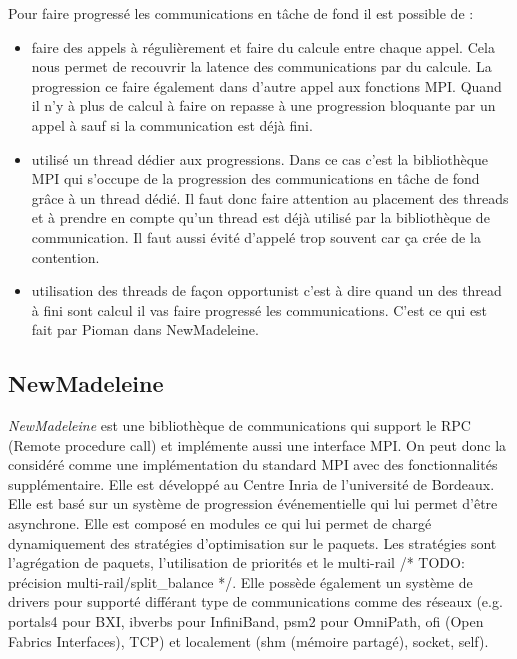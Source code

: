 Pour faire progressé les communications en tâche de fond il est possible de :

\begin{itemize}
  \item faire des appels à  régulièrement et faire du calcule entre chaque appel.
  Cela nous permet de recouvrir la latence des communications par du calcule.
  La progression ce faire également dans d'autre appel aux fonctions MPI.
  Quand il n'y à plus de calcul à faire on repasse à une progression bloquante par un appel à  sauf si la communication est déjà fini.
  \item utilisé un thread dédier aux progressions.
  Dans ce cas c'est la bibliothèque MPI qui s'occupe de la progression des communications en tâche de fond grâce à un thread dédié.
  Il faut donc faire attention au placement des threads et à prendre en compte qu'un thread est déjà utilisé par la bibliothèque de communication.
  Il faut aussi évité d'appelé trop souvent  car ça crée de la contention.
  \item utilisation des threads de façon opportunist c'est à dire quand un des thread à fini sont calcul il vas faire progressé les communications.
  C'est ce qui est fait par Pioman dans NewMadeleine.
\end{itemize}

\subsection{NewMadeleine}

\emph{NewMadeleine} est une bibliothèque de communications qui support le RPC (Remote procedure call) et implémente aussi une interface MPI.
On peut donc la considéré comme une implémentation du standard MPI avec des fonctionnalités supplémentaire.
Elle est développé au Centre Inria de l'université de Bordeaux.
Elle est basé sur un système de progression événementielle qui lui permet d'être asynchrone.
Elle est composé en modules ce qui lui permet de chargé dynamiquement des stratégies d'optimisation sur le paquets.
Les stratégies sont l'agrégation de paquets, l'utilisation de priorités et le multi-rail /* TODO: précision multi-rail/split_balance */.
Elle possède également un système de drivers pour supporté différant type de communications comme des réseaux
(e.g. portals4 pour BXI, ibverbs pour InfiniBand, psm2 pour OmniPath, ofi (Open Fabrics Interfaces), TCP) %
et localement (shm (mémoire partagé), socket, self).

